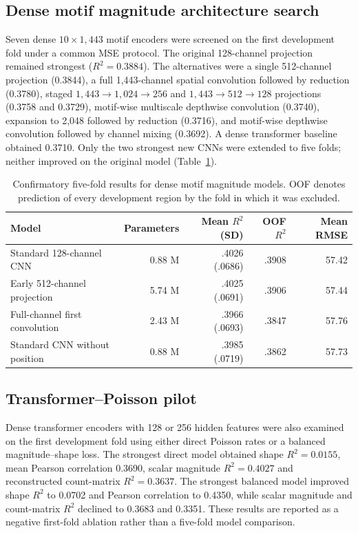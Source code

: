 \documentclass[a4paper,12pt]{article}
\begin{document}
\subsection*{Dense motif magnitude architecture search}

Seven dense $10\times1{,}443$ motif encoders were screened on the first development fold under a common MSE protocol. The original 128-channel projection remained strongest ($R^2=0.3884$). The alternatives were a single 512-channel projection (0.3844), a full 1,443-channel spatial convolution followed by reduction (0.3780), staged $1{,}443\rightarrow1{,}024\rightarrow256$ and $1{,}443\rightarrow512\rightarrow128$ projections (0.3758 and 0.3729), motif-wise multiscale depthwise convolution (0.3740), expansion to 2,048 followed by reduction (0.3716), and motif-wise depthwise convolution followed by channel mixing (0.3692). A dense transformer baseline obtained 0.3710. Only the two strongest new CNNs were extended to five folds; neither improved on the original model (Table~\ref{tab:densemagnitude}).

\begin{table}[htbp]
\centering
\caption{Confirmatory five-fold results for dense motif magnitude models. OOF denotes prediction of every development region by the fold in which it was excluded.}
\label{tab:densemagnitude}
\small
\begin{tabular}{lrrrr}
\toprule
Model & Parameters & Mean $R^2$ (SD) & OOF $R^2$ & Mean RMSE \\
\midrule
Standard 128-channel CNN & 0.88 M & .4026 (.0686) & .3908 & 57.42 \\
Early 512-channel projection & 5.74 M & .4025 (.0691) & .3906 & 57.44 \\
Full-channel first convolution & 2.43 M & .3966 (.0693) & .3847 & 57.76 \\
Standard CNN without position & 0.88 M & .3985 (.0719) & .3862 & 57.73 \\
\bottomrule
\end{tabular}
\end{table}

\subsection*{Transformer--Poisson pilot}

Dense transformer encoders with 128 or 256 hidden features were also examined on the first development fold using either direct Poisson rates or a balanced magnitude--shape loss. The strongest direct model obtained shape $R^2=0.0155$, mean Pearson correlation 0.3690, scalar magnitude $R^2=0.4027$ and reconstructed count-matrix $R^2=0.3637$. The strongest balanced model improved shape $R^2$ to 0.0702 and Pearson correlation to 0.4350, while scalar magnitude and count-matrix $R^2$ declined to 0.3683 and 0.3351. These results are reported as a negative first-fold ablation rather than a five-fold model comparison.
\end{document}

